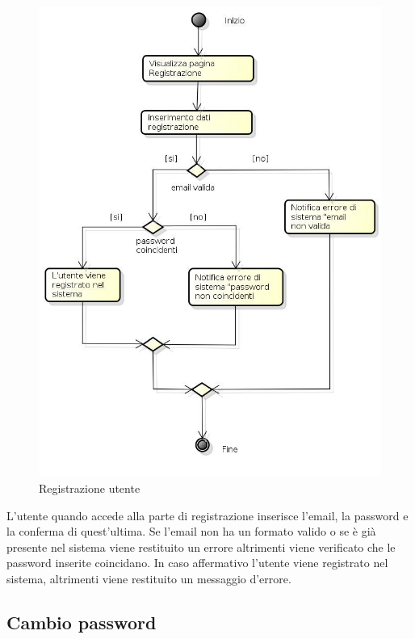 \begin{figure}[h!]
		\centering
		\includegraphics[scale=.5]{img/attivita/Registrazione.jpg}
		\caption{Registrazione utente}
		\label{fig:Registrazione}
\end{figure}

L'utente quando accede alla parte di registrazione inserisce l'email, la password e la conferma di quest'ultima. Se l'email non ha un formato valido o se è già presente nel sistema viene restituito un errore altrimenti viene verificato che le password inserite coincidano. In caso affermativo l'utente viene registrato nel sistema, altrimenti viene restituito un messaggio d'errore.

\newpage

\subsection{Cambio password}

